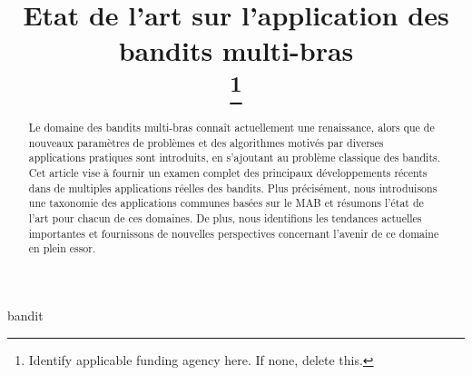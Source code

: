 \documentclass[conference]{IEEEtran}
\newcommand{\1}[1]{\mathbbm{1}_{\left\{#1\right\}}}
\begin{document}
\title{Etat de l'art sur l'application des bandits multi-bras \\

\thanks{Identify applicable funding agency here. If none, delete this.}
}

\author{
}

\maketitle

\begin{abstract}
Le domaine des bandits multi-bras connaît actuellement une renaissance, alors que de nouveaux paramètres de problèmes et des algorithmes motivés par diverses applications pratiques sont introduits, en s'ajoutant au problème classique des bandits. Cet article vise à fournir un examen complet des principaux développements récents dans de multiples applications réelles des bandits. Plus précisément, nous introduisons une taxonomie des applications communes basées sur le MAB et résumons l'état de l'art pour chacun de ces domaines. De plus, nous identifions les tendances actuelles importantes et fournissons de nouvelles perspectives concernant l'avenir de ce domaine en plein essor.
\end{abstract}

\begin{IEEEkeywords}
bandit
\end{IEEEkeywords}
\end{document}
